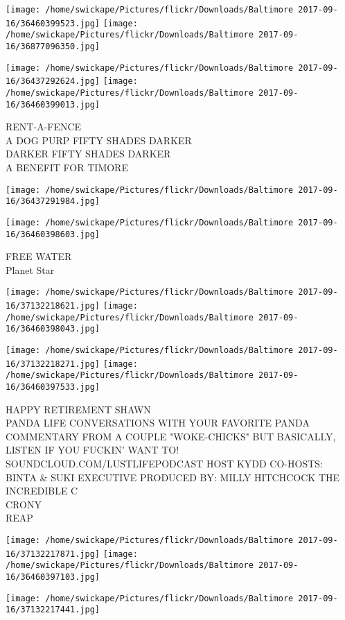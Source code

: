 \documentclass[10pt,letterpaper]{article}
\begin{document}
\texttt{[image: /home/swickape/Pictures/flickr/Downloads/Baltimore 2017-09-16/36460399523.jpg]}
\texttt{[image: /home/swickape/Pictures/flickr/Downloads/Baltimore 2017-09-16/36877096350.jpg]}

\texttt{[image: /home/swickape/Pictures/flickr/Downloads/Baltimore 2017-09-16/36437292624.jpg]}
\texttt{[image: /home/swickape/Pictures/flickr/Downloads/Baltimore 2017-09-16/36460399013.jpg]}

RENT{-}A{-}FENCE\\
A DOG PURP FIFTY SHADES DARKER\\
DARKER FIFTY SHADES DARKER\\
A BENEFIT FOR TIMORE
\pagebreak

\texttt{[image: /home/swickape/Pictures/flickr/Downloads/Baltimore 2017-09-16/36437291984.jpg]}

\vspace{0.25in}
\texttt{[image: /home/swickape/Pictures/flickr/Downloads/Baltimore 2017-09-16/36460398603.jpg]}

FREE WATER\\
Planet Star
\pagebreak

\texttt{[image: /home/swickape/Pictures/flickr/Downloads/Baltimore 2017-09-16/37132218621.jpg]}
\texttt{[image: /home/swickape/Pictures/flickr/Downloads/Baltimore 2017-09-16/36460398043.jpg]}

\texttt{[image: /home/swickape/Pictures/flickr/Downloads/Baltimore 2017-09-16/37132218271.jpg]}
\texttt{[image: /home/swickape/Pictures/flickr/Downloads/Baltimore 2017-09-16/36460397533.jpg]}

HAPPY RETIREMENT SHAWN\\
PANDA LIFE CONVERSATIONS WITH YOUR FAVORITE PANDA COMMENTARY FROM A COUPLE "WOKE{-}CHICKS" BUT BASICALLY, LISTEN IF YOU FUCKIN' WANT TO!  SOUNDCLOUD.COM/LUSTLIFEPODCAST HOST KYDD CO{-}HOSTS: BINTA \& SUKI EXECUTIVE PRODUCED BY: MILLY HITCHCOCK THE INCREDIBLE C\\
CRONY\\
REAP
\pagebreak

\texttt{[image: /home/swickape/Pictures/flickr/Downloads/Baltimore 2017-09-16/37132217871.jpg]}
\texttt{[image: /home/swickape/Pictures/flickr/Downloads/Baltimore 2017-09-16/36460397103.jpg]}

\texttt{[image: /home/swickape/Pictures/flickr/Downloads/Baltimore 2017-09-16/37132217441.jpg]}
\end{document}
